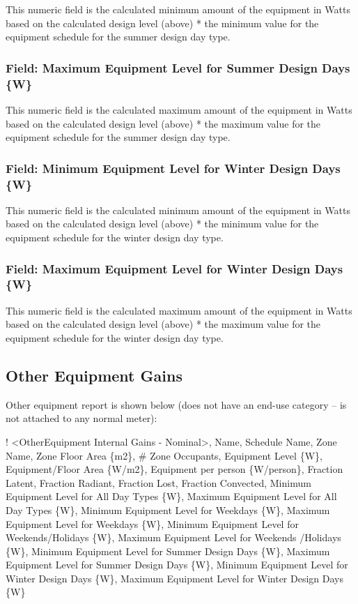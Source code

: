 This numeric field is the calculated minimum amount of the equipment in Watts based on the calculated design level (above) * the minimum value for the equipment schedule for the summer design day type.

\subsubsection{Field: Maximum Equipment Level for Summer Design Days \{W\}}\label{field-maximum-equipment-level-for-summer-designdays-w}

This numeric field is the calculated maximum amount of the equipment in Watts based on the calculated design level (above) * the maximum value for the equipment schedule for the summer design day type.

\subsubsection{Field: Minimum Equipment Level for Winter Design Days \{W\}}\label{field-minimum-equipment-level-for-winter-designdays-w}

This numeric field is the calculated minimum amount of the equipment in Watts based on the calculated design level (above) * the minimum value for the equipment schedule for the winter design day type.

\subsubsection{Field: Maximum Equipment Level for Winter Design Days \{W\}}\label{field-maximum-equipment-level-for-winter-designdays-w}

This numeric field is the calculated maximum amount of the equipment in Watts based on the calculated design level (above) * the maximum value for the equipment schedule for the winter design day type.

\subsection{Other Equipment Gains}\label{other-equipment-gains}

Other equipment report is shown below (does not have an end-use category -- is not attached to any normal meter):

! \textless{}OtherEquipment Internal Gains - Nominal\textgreater{}, Name, Schedule Name, Zone Name, Zone Floor Area \{m2\}, \# Zone Occupants, Equipment Level \{W\}, Equipment/Floor Area \{W/m2\}, Equipment per person \{W/person\}, Fraction Latent, Fraction Radiant, Fraction Lost, Fraction Convected, Minimum Equipment Level for All Day Types \{W\}, Maximum Equipment Level for All Day Types \{W\}, Minimum Equipment Level for Weekdays \{W\}, Maximum Equipment Level for Weekdays \{W\}, Minimum Equipment Level for Weekends/Holidays \{W\}, Maximum Equipment Level for Weekends /Holidays \{W\}, Minimum Equipment Level for Summer Design Days \{W\}, Maximum Equipment Level for Summer Design Days \{W\}, Minimum Equipment Level for Winter Design Days \{W\}, Maximum Equipment Level for Winter Design Days \{W\}

